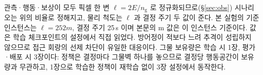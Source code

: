 \begin{table}[htbp]
\centering
\caption{교전 시나리오와 관측 설정 (길이는 관측 픽셀 한 변 $\ell$ 단위)}
\label{tab:scenario}
\footnotesize
{}
\\[3pt]
\begin{minipage}{\linewidth}\footnotesize
관측·행동·보상이 모두 픽셀 한 변 $\ell = 2E/n_{\mathrm{g}}$ 로 정규화되므로(\S\ref{sec:obs}) 시나리오는 위의 비율로 정해지고, 물리 척도는 $\ell$ 과 결정 주기 두 값이 준다. 본 실험의 기준 인스턴스는 $\ell = 252\unit{m}$, 결정 주기 25\,s 이며 본문의 m 값은 이 인스턴스 기준이다. 값은 학습 체크포인트의 설정에서 직접 읽었다. 방어정이 적보다 느려 추격이 성립하지 않으므로 접근 회랑의 선제 차단이 유일한 대응이다. 그물 보유량은 학습 시 1장, 평가·배포 시 3장이다: 정책은 결정마다 그물벽 하나를 놓으므로 결정당 행동공간이 보유량과 무관하고, 1장으로 학습한 정책이 재학습 없이 3장 설정에서 동작한다.
\end{minipage}
\end{table}
